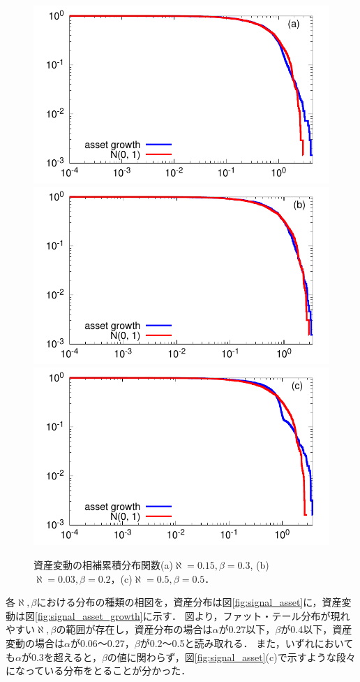 \documentclass[titlepage]{jsreport}
\begin{document}
\begin{figure}[htbp]
    \centering
    \includegraphics[width=0.7\linewidth]{fig/asset_growth_a015_b03.pdf}
    \includegraphics[width=0.7\linewidth]{fig/asset_growth_a003_b02.pdf}
    \includegraphics[width=0.7\linewidth]{fig/asset_growth_a05_b05.pdf}
    \caption{資産変動の相補累積分布関数(a)$\aleph = 0.15, \beta = 0.3$, (b)$\aleph = 0.03, \beta = 0.2$，(c)$\aleph = 0.5, \beta = 0.5$．}
    \label{fig:model_asset_growth_survival}
\end{figure}


各$\aleph, \beta$における分布の種類の相図を，資産分布は図\ref{fig:signal_asset}に，資産変動は図\ref{fig:signal_asset_growth}に示す．
図より，ファット・テール分布が現れやすい$\aleph, \beta$の範囲が存在し，資産分布の場合は$\alpha$が0.27以下，$\beta$が0.4以下，資産変動の場合は$\alpha$が0.06～0.27，$\beta$が0.2～0.5と読み取れる．
また，いずれにおいても$\alpha$が0.3を超えると，$\beta$の値に関わらず，図\ref{fig:signal_asset}(c)で示すような段々になっている分布をとることが分かった．
\end{document}
